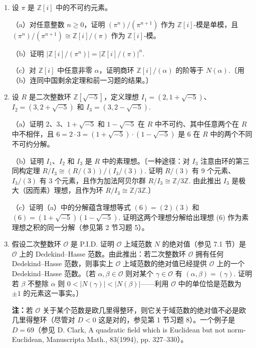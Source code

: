 \begin{enumerate}
\item 设 \(\pi\) 是 \(\mathbb{Z}[i]\) 中的不可约元素。

（a）对任意整数 \(n \geq 0\)，证明 \((\pi^n)/(\pi^{n+1})\) 作为 \(\mathbb{Z}[i]\)-模是单模，且 \((\pi^n)/(\pi^{n+1}) \cong \mathbb{Z}[i]/(\pi)\) 作为 \(\mathbb{Z}[i]\)-模。

（b）证明 \(|\mathbb{Z}[i]/(\pi^n)| = |\mathbb{Z}[i]/(\pi)|^n\).

（c）对 \(\mathbb{Z}[i]\) 中任意非零 \(\alpha\)，证明商环 \(\mathbb{Z}[i]/(\alpha)\) 的阶等于 \(N(\alpha)\).〔用（b）连同中国剩余定理和前一习题的结果。〕

\item 设 \(R\) 是二次整数环 \(\mathbb{Z}[\sqrt{-5}]\)，定义理想 \(I_1 = (2, 1+\sqrt{-5})\)、\(I_2 = (3, 2+\sqrt{-5})\) 和 \(I_3 = (3, 2-\sqrt{-5})\).

（a）证明 \(2\)、\(3\)、\(1+\sqrt{-5}\) 和 \(1-\sqrt{-5}\) 在 \(R\) 中不可约、其中任意两个在 \(R\) 中不相伴，且 \(6 = 2 \cdot 3 = (1+\sqrt{-5})\cdot(1-\sqrt{-5})\) 是 6 在 \(R\) 中的两个不同不可约分解。

（b）证明 \(I_1\)、\(I_2\) 和 \(I_3\) 是 \(R\) 中的素理想。〔一种途径：对 \(I_3\) 注意由环的第三同构定理 \(R/I_3 \cong (R/(3))/(I_3/(3))\). 证明 \(R/(3)\) 有 9 个元素、\(I_3/(3)\) 有 3 个元素，且作为加法阿贝尔群 \(R/I_3 \cong \mathbb{Z}/3\mathbb{Z}\). 由此推出 \(I_3\) 是极大（因而素）理想，且作为环 \(R/I_3 \cong \mathbb{Z}/3\mathbb{Z}\).〕

（c）证明（a）中的分解蕴含理想等式 \((6) = (2)(3)\) 和 \((6) = (1+\sqrt{-5})(1-\sqrt{-5})\). 证明这两个理想分解给出理想 (6) 作为素理想之积的同一分解（参见第 2 节习题 5）。

\item 假设二次整数环 \(\mathcal{O}\) 是 P.I.D. 证明 \(\mathcal{O}\) 上域范数 \(N\) 的绝对值（参见 7.1 节）是 \(\mathcal{O}\) 上的 Dedekind--Hasse 范数。由此推出：若二次整数环 \(\mathcal{O}\) 拥有任何 Dedekind--Hasse 范数，则事实上 \(\mathcal{O}\) 上域范数的绝对值已经提供 \(\mathcal{O}\) 上的一个 Dedekind--Hasse 范数。〔若 \(\alpha, \beta \in \mathcal{O}\) 则对某个 \(\gamma \in \mathcal{O}\) 有 \((\alpha, \beta) = (\gamma)\). 证明若 \(\beta\) 不整除 \(\alpha\) 则 \(0 < |N(\gamma)| < |N(\beta)|\)——利用 \(\mathcal{O}\) 中的单位恰是范数为 \(\pm 1\) 的元素这一事实。〕

\noindent\textbf{注：}若 \(\mathcal{O}\) 关于某个范数是欧几里得整环，则它关于域范数的绝对值不必是欧几里得整环（尽管对 \(D < 0\) 这是对的，参见第 1 节习题 8）。一个例子是 \(D = 69\)（参见 D. Clark, A quadratic field which is Euclidean but not norm-Euclidean, Manuscripta Math., 83(1994), pp. 327--330）。


\end{enumerate}

